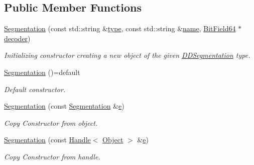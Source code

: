 \subsection*{Public Member Functions}
\begin{DoxyCompactItemize}
\item 
\hyperlink{class_d_d4hep_1_1_geometry_1_1_segmentation_a2f79df442e650659511590bcde2405b4}{Segmentation} (const std\+::string \&\hyperlink{class_d_d4hep_1_1_geometry_1_1_segmentation_ad7ddeca9128936f2d36618f9342b13fe}{type}, const std\+::string \&\hyperlink{class_d_d4hep_1_1_handle_a27c7d467a609ab32c133e1f3c7d85ef5}{name}, \hyperlink{class_d_d4hep_1_1_d_d_segmentation_1_1_bit_field64}{Bit\+Field64} $\ast$\hyperlink{class_d_d4hep_1_1_geometry_1_1_segmentation_acab8b5976de44a26178bab5b9b92dad7}{decoder})
\begin{DoxyCompactList}\small\item\em Initializing constructor creating a new object of the given \hyperlink{namespace_d_d4hep_1_1_d_d_segmentation}{D\+D\+Segmentation} type. \end{DoxyCompactList}\item 
\hyperlink{class_d_d4hep_1_1_geometry_1_1_segmentation_a191b65b0384259a4b204a2aaedfd2f9c}{Segmentation} ()=default
\begin{DoxyCompactList}\small\item\em Default constructor. \end{DoxyCompactList}\item 
\hyperlink{class_d_d4hep_1_1_geometry_1_1_segmentation_a0d8474b604d7eb4ca635007f9e46cbc2}{Segmentation} (const \hyperlink{class_d_d4hep_1_1_geometry_1_1_segmentation}{Segmentation} \&\hyperlink{_volumes_8cpp_a8a9a1f93e9b09afccaec215310e64142}{e})
\begin{DoxyCompactList}\small\item\em Copy Constructor from object. \end{DoxyCompactList}\item 
\hyperlink{class_d_d4hep_1_1_geometry_1_1_segmentation_a52de777daf55b13d94eae2eb8f794b89}{Segmentation} (const \hyperlink{class_d_d4hep_1_1_handle}{Handle}$<$ \hyperlink{class_d_d4hep_1_1_geometry_1_1_segmentation_a91154cc3b58985ac86388d00572ee48f}{Object} $>$ \&\hyperlink{_volumes_8cpp_a8a9a1f93e9b09afccaec215310e64142}{e})
\begin{DoxyCompactList}\small\item\em Copy Constructor from handle. \end{DoxyCompactList}\item 

\end{DoxyCompactItemize}
